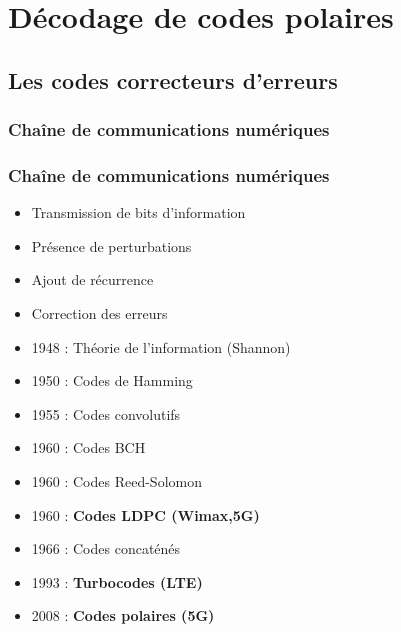 

\section[Introduction]{Décodage de codes polaires}
\subsection*{Les codes correcteurs d'erreurs}

\begin{frame}[c]
	\begin{center}
	\end{center}
  	\frametitle<1>{Chaîne de communications numériques}
  	\frametitle<2->{Chaîne de communications numériques}
	\begin{itemize}
		\item<1-> Transmission de bits d'information
		\item<2-> Présence de perturbations
		\item<7-> Ajout de récurrence
		\item<9-> Correction des erreurs
	\end{itemize}
\end{frame}

\begin{frame}[c]
	\tableofcontents[
	subsectionstyle=hide,
	]
\end{frame}

\begin{frame}
\vfill
	\begin{itemize}
		\item 1948 : Théorie de l’information (Shannon)
		\item 1950 : Codes de Hamming
		\item 1955 : Codes convolutifs
		\item 1960 : Codes BCH
		\item 1960 : Codes Reed-Solomon
		\item 1960 : \textbf{Codes LDPC (Wimax,5G)}
		\item 1966 : Codes concaténés
		\item 1993 : \textbf{Turbocodes (LTE)}
		\item 2008 : \textbf{Codes polaires (5G)}
	\end{itemize}
	\vfill
\end{frame}

